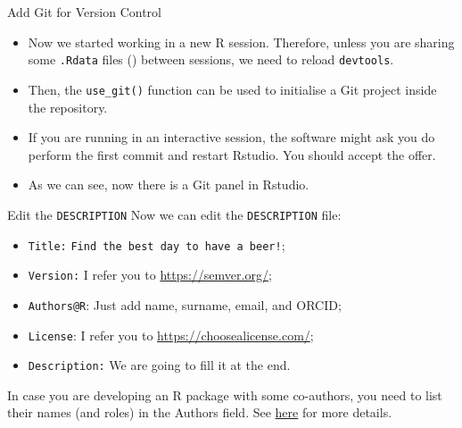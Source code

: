 \documentclass[
hyperref={bookmarks=false},
xcolor={dvipsnames,svgnames*,x11names*}, 
12pt
]{beamer}
\begin{document}
\begin{frame}[fragile]{Add Git for Version Control}
\vspace{-0.5cm}
\begin{itemize}
\itemsep 2ex
\item Now we started working in a new R session. Therefore, unless you are sharing some \texttt{.Rdata} files () between sessions, we need to reload \texttt{devtools}.
\item Then, the \texttt{use\_git()} function can be used to initialise a Git project inside the repository. 
\item If you are running in an interactive session, the software might ask you do perform the first commit and restart Rstudio. You should accept the offer. 
\item As we can see, now there is a Git panel in Rstudio. 
\end{itemize}
\end{frame}

\begin{frame}{Edit the \texttt{DESCRIPTION}}
\vspace{-0.5cm}
Now we can edit the \texttt{DESCRIPTION} file:
\begin{itemize}
\itemsep 1ex
\item \texttt{Title:} \texttt{Find the best day to have a beer!};
\item \texttt{Version:} I refer you to \url{https://semver.org/}; 
\item \texttt{Authors@R}: Just add name, surname, email, and ORCID; 
\item \texttt{License}: I refer you to \url{https://choosealicense.com/};
\item \texttt{Description:} We are going to fill it at the end.
\end{itemize}
In case you are developing an R package with some co-authors, you need to list their names (and roles) in the Authors field. See \href{https://r-pkgs.org/description.html\#sec-description-authors-at-r}{here} for more details. 
\end{frame}
\end{document}
